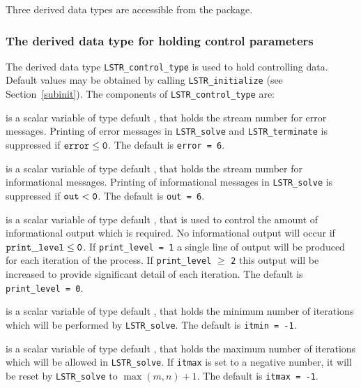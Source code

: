 \documentclass{galahad}
\newcommand{\packagename}{LS\-TR}
\begin{document}

\galtypes
Three derived data types are accessible from the package.


\subsubsection{The derived data type for holding control 
 parameters}\label{typecontrol}
The derived data type 
{\tt \packagename\_control\_type} 
is used to hold controlling data. Default values may be obtained by calling 
{\tt \packagename\_initialize}
(see Section~\ref{subinit}). The components of 
{\tt \packagename\_control\_type} 
are:

\begin{description}
 is a scalar variable of type default \integer, that holds the 
stream number for error messages. 
Printing of error messages in  
{\tt \packagename\_solve} and {\tt \packagename\_terminate} 
is suppressed if ${\tt error} \leq {\tt 0}$. 
The default is {\tt error = 6}.
 
 is a scalar variable of type default \integer, that holds the 
stream number for informational messages. 
Printing of informational messages in  
{\tt \packagename\_solve} is suppressed if ${\tt out} < {\tt 0}$. 
The default is {\tt out = 6}.
 
 is a scalar variable of type default \integer, 
that is used 
to control the amount of informational output which is required. No  
informational output will occur if ${\tt print\_level} \leq {\tt 0}$. If  
{\tt print\_level = 1} a single line of output will be produced for each 
iteration of the process. If {\tt print\_level} $\geq$ {\tt 2} this output 
will be increased to provide significant detail of each iteration. 
The default is {\tt print\_level = 0}.
 
 is a scalar variable of type default \integer, that holds the 
minimum number of iterations which will be performed by
{\tt \packagename\_solve}. 
The default is {\tt itmin = -1}.
 
 is a scalar variable of type default \integer, that holds the 
maximum number of iterations which will be allowed in 
{\tt \packagename\_solve}. 
If {\tt itmax} is set to a negative number, it will be reset by  
{\tt \packagename\_solve} to $\max(m,n)+1$.
The default is {\tt itmax = -1}.
 

\end{description}
\end{document}
